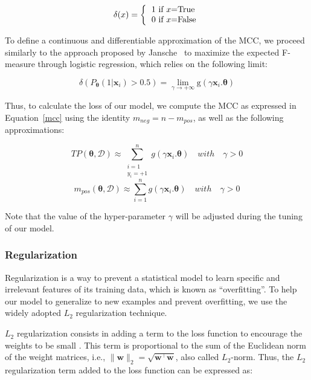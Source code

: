 \begin{equation}
\label{kronecker}
    \delta(x) = \bigg\{\begin{tabular}{l}
1 if $x$=True\\
0 if $x$=False
\end{tabular}
\end{equation}

To define a continuous and differentiable approximation of the MCC, we proceed similarly to the approach proposed by Jansche~\cite{jansche2005maximum} to maximize the expected F-measure through logistic regression, which relies on the following limit:

\begin{equation}
\label{equation: approx}
\delta(P_{\bm{\theta}}(1|\textbf{x}_{i}) > 0.5) = \lim_{\gamma \to + \infty} \text{g}(\gamma\textbf{x}_{i}.\bm{\theta})
\end{equation}

Thus, to calculate the loss of our model, we compute the MCC as expressed in Equation~\ref{mcc} using the identity $m_{neg} = n - m_{pos}$, as well as the following approximations: 

\begin{equation}
TP(\bm{\theta}, \mathcal{D}) \approx \sum_{\substack{i=1 \\ y_{i} = +1}}^{n} g(\gamma \textbf{x}_{i}.\bm{\theta}) \quad with \quad \gamma > 0
\end{equation}
\begin{equation}
m_{pos}(\bm{\theta}, \mathcal{D}) \approx \sum_{i=1}^{n} g(\gamma \textbf{x}_{i}.\bm{\theta}) \quad with \quad \gamma > 0
\end{equation}

Note that the value of the hyper-parameter $\gamma$ will be adjusted during the tuning of our model.

\subsubsection{Regularization}
\label{subsection: regularization}
Regularization is a way to prevent a statistical model to learn specific and irrelevant features of its training data, which is known as ``overfitting''. To help our model to generalize to new examples and prevent overfitting, we use the widely adopted $L_{2}$ regularization technique.

$L_{2}$ regularization consists in adding a term to the loss function to encourage the weights to be small \cite{witten2016data}. This term is proportional to the sum of the Euclidean norm of the weight matrices, i.e., $\|\textbf{w}\|_{2}=\sqrt{\textbf{w}^{\top}\textbf{w}}$, also called $L_{2}$-norm. Thus, the $L_{2}$ regularization term added to the loss function can be expressed as:

